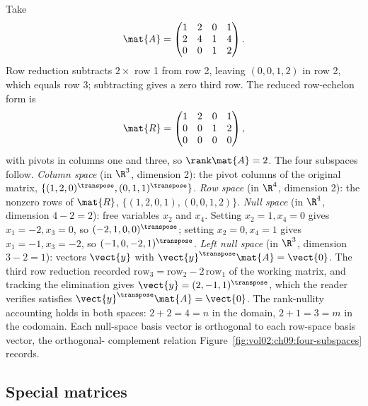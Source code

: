 

\begin{example}
Take
\[
\mat{A} = \begin{pmatrix} 1 & 2 & 0 & 1 \\ 2 & 4 & 1 & 4 \\ 0 & 0 & 1
& 2 \end{pmatrix}.
\]
Row reduction subtracts $2\times$ row 1 from row 2, leaving
$(0,0,1,2)$ in row 2, which equals row 3; subtracting gives a zero
third row. The reduced row-echelon form is
\[
\mat{R} = \begin{pmatrix} 1 & 2 & 0 & 1 \\ 0 & 0 & 1 & 2 \\ 0 & 0 & 0
& 0 \end{pmatrix},
\]
with pivots in columns one and three, so $\rank \mat{A} = 2$. The
four subspaces follow.
\emph{Column space} (in $\R^{3}$, dimension 2): the pivot columns of
the original matrix, $\{(1,2,0)^{\transpose}, (0,1,1)^{\transpose}\}$.
\emph{Row space} (in $\R^{4}$, dimension 2): the nonzero rows of
$\mat{R}$, $\{(1,2,0,1), (0,0,1,2)\}$.
\emph{Null space} (in $\R^{4}$, dimension $4 - 2 = 2$): free
variables $x_{2}$ and $x_{4}$. Setting $x_{2} = 1, x_{4} = 0$ gives
$x_{1} = -2, x_{3} = 0$, so $(-2, 1, 0, 0)^{\transpose}$; setting
$x_{2} = 0, x_{4} = 1$ gives $x_{1} = -1, x_{3} = -2$, so $(-1, 0,
-2, 1)^{\transpose}$.
\emph{Left null space} (in $\R^{3}$, dimension $3 - 2 = 1$): vectors
$\vect{y}$ with $\vect{y}^{\transpose}\mat{A} = \vect{0}$. The third
row reduction recorded $\text{row}_{3} = \text{row}_{2} - 2\,
\text{row}_{1}$ of the working matrix, and tracking the elimination
gives $\vect{y} = (2, -1, 1)^{\transpose}$, which the reader verifies
satisfies $\vect{y}^{\transpose}\mat{A} = \vect{0}$.
The rank-nullity accounting holds in both spaces: $2 + 2 = 4 = n$ in
the domain, $2 + 1 = 3 = m$ in the codomain. Each null-space basis
vector is orthogonal to each row-space basis vector, the orthogonal-%
complement relation Figure~\ref{fig:vol02:ch09:four-subspaces}
records.
\end{example}

\subsection{Special matrices}

